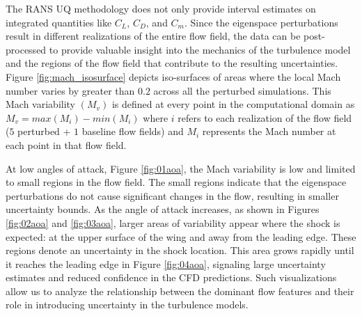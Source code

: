 The RANS UQ methodology does not only provide interval estimates on integrated quantities like $C_L$, $C_D$, and $C_m$.
Since the eigenspace perturbations result in different realizations of the entire flow field, the data can be post-processed to provide valuable insight into the mechanics of the turbulence model and the regions of the flow field that contribute to the resulting uncertainties.
Figure \ref{fig:mach_isosurface} depicts iso-surfaces of areas where the local Mach number varies by greater than $0.2$ across all the perturbed simulations.
This Mach variability $(M_v)$ is defined at every point in the computational domain as $M_v = max(M_i) - min(M_i)$ where $i$ refers to each realization of the flow field ($5$ perturbed + $1$ baseline flow fields) and $M_i$ represents the Mach number at each point in that flow field. 

At low angles of attack, Figure \ref{fig:01aoa}, the Mach variability is low and limited to small regions in the flow field.
The small regions indicate that the eigenspace perturbations do not cause significant changes in the flow, resulting in smaller uncertainty bounds.
As the angle of attack increases, as shown in Figures \ref{fig:02aoa} and \ref{fig:03aoa}, larger areas of variability appear where the shock is expected: at the upper surface of the wing and away from the leading edge.
These regions denote an uncertainty in the shock location.
This area grows rapidly until it reaches the leading edge in Figure \ref{fig:04aoa}, signaling large uncertainty estimates and reduced confidence in the CFD predictions.
Such visualizations allow us to analyze the relationship between the dominant flow features and their role in introducing uncertainty in the turbulence models. 

